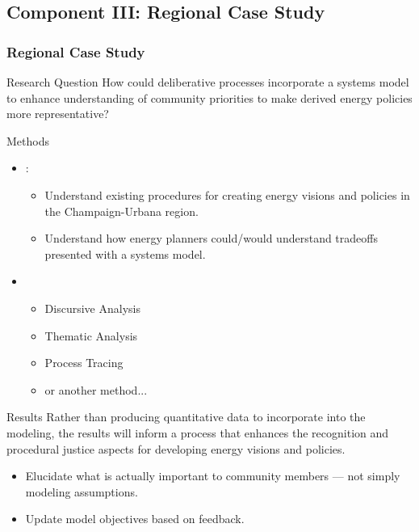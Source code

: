\subsection{Component III: Regional Case Study}
\begin{frame}[allowframebreaks]
    \frametitle{Regional Case Study}

    \begin{block}{Research Question}
        How could deliberative processes incorporate a systems model to enhance
        understanding of community priorities to make derived energy policies
        more representative?
    \end{block}

    \begin{block}{Methods}
        \begin{itemize}
            \item {}: 
            \begin{itemize}
                \item Understand existing procedures for creating energy visions
                and policies in the Champaign-Urbana region.
                \item Understand how energy planners could/would understand
                tradeoffs presented with a systems model.
            \end{itemize}
            \item {} %
            \begin{itemize}
                \item Discursive Analysis %
                \item Thematic Analysis
                \item Process Tracing
                \item or another method... 
            \end{itemize}
        \end{itemize}
    \end{block}
    \begin{block}{Results}
        Rather than producing quantitative data to incorporate into the
        modeling, the results will inform a process that enhances the
        recognition and procedural justice aspects for developing energy visions
        and policies.

        \begin{itemize}
            \item Elucidate what is actually important to community members ---
            not simply modeling assumptions.
            \item Update model objectives based on feedback.
        \end{itemize}
    \end{block}

\end{frame}


